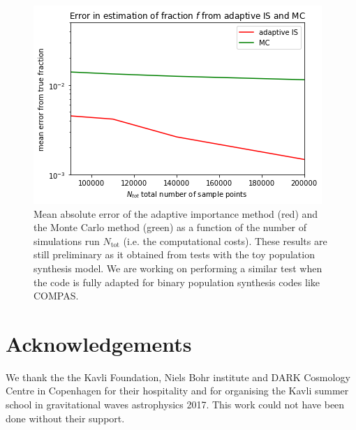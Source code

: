 \documentclass[a4paper,fleqn,usenatbib]{mnras}
\begin{document}
\begin{figure}
	\includegraphics[width=\columnwidth]{figure22}
    \caption{Mean absolute error of the adaptive importance method (red) and the Monte Carlo method (green) as a function of the number of simulations run $N_{\text{tot}}$ (i.e. the computational costs). These results are still preliminary as it obtained from tests with the toy population synthesis model. We are working on performing a similar test when the code is fully adapted for binary population synthesis codes like COMPAS. }
    \label{fig:example_figure}
\end{figure}





\section*{Acknowledgements}

We thank the the Kavli Foundation, Niels Bohr institute and DARK Cosmology Centre in Copenhagen for their hospitality and for organising the Kavli summer school in gravitational waves astrophysics 2017. This work could not have been done without their support. 



\end{document}
